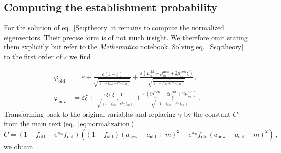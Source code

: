 \documentclass[11pt]{article}
\begin{document}

\subsection{Computing the establishment probability}
For the solution of eq.~\eqref{Seq:theory} it remains to compute the normalized eigenvectors. Their precise form is of not much insight. We therefore omit stating them explicitly but refer to the \textit{Mathematica} notebook. Solving eq.~\eqref{Seq:theory} to the first order of $\varepsilon$ we find

\begin{equation}
\begin{aligned}
\varphi_{\text{old}} &= \varepsilon + \frac{\varepsilon\left(1-\xi\right)}{\sqrt{\frac{\gamma}{(1-f_{\text{old}}+ e^{\pi_m} f_{\text{old}})}}}  + \frac{\varepsilon\left(\mu_m^{\text{old}} -\mu_m^{\text{new}} + 2 \mu_m^{\text{new}}\xi  \right)}{\sqrt{\frac{\gamma}{(1-f_{\text{old}}+ e^{\pi_m} f_{\text{old}})}}}\, ,\\
\varphi_{\text{new}} &= \varepsilon\xi + \frac{\varepsilon\xi \left(\xi-1\right)}{\sqrt{\frac{\gamma}{(1-f_{\text{old}}+ e^{\pi_m} f_{\text{old}})}}} + \frac{\varepsilon\left(\xi \mu_m^{\text{new}} -\xi \mu_m^{\text{old}} + 2 \mu_m^{\text{old}}  \right)}{\sqrt{\frac{\gamma}{(1-f_{\text{old}}+ e^{\pi_m} f_{\text{old}})}}}\, .
\end{aligned}
\end{equation}
%
Transforming back to the original variables and replacing $\gamma$ by the constant $C$ from the main text (eq.~\eqref{eq:normalization})
\begin{equation}
C = (1-f_{\text{old}}+ e^{\pi_m} f_{\text{old}}) \left((1-f_{\text{old}})(a_{\text{new}}-a_{\text{old}}+m)^2 +  e^{\pi_m} f_{\text{old}} (a_{\text{new}}-a_{\text{old}}-m)^2\right)\, ,
\end{equation}
we obtain
\end{document}

